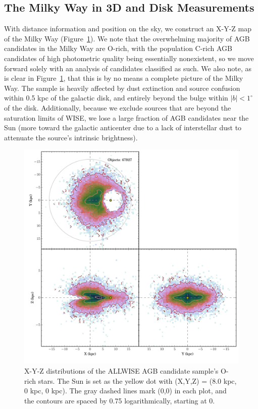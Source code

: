 \subsection{The Milky Way in 3D and Disk Measurements}
With distance information and position on the sky, we construct an X-Y-Z map of the Milky Way (Figure~\ref{fig:xyz_candidates}). We note that the overwhelming majority of AGB candidates in the Milky Way are O-rich, with the population C-rich AGB candidates of high photometric quality being essentially nonexistent, so we move forward solely with an analysis of candidates classified as such. We also note, as is clear in Figure~\ref{fig:xyz_candidates}, that this is by no means a complete picture of the Milky Way. The sample is heavily affected by dust extinction and source confusion within 0.5 kpc of the galactic disk, and entirely beyond the bulge within $|b| < 1^\circ$ of the disk. Additionally, because we exclude sources that are beyond the saturation limits of WISE, we lose a large fraction of AGB candidates near the Sun (more toward the galactic anticenter due to a lack of interstellar dust to attenuate the source's intrinsic brightness).

\begin{figure}[h]
\centering
\includegraphics[width=5in]{figs/orich_candidates_xyz.pdf}
\caption{X-Y-Z distributions of the ALLWISE AGB candidate sample's O-rich stars. The Sun is set as the yellow dot with (X,Y,Z) = (8.0 kpc, 0 kpc, 0 kpc). The gray dashed lines mark (0,0) in each plot, and the contours are spaced by 0.75 logarithmically, starting at 0.}
\label{fig:xyz_candidates}
\end{figure}


